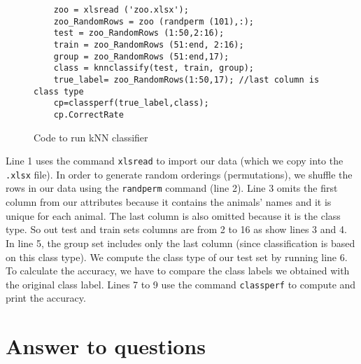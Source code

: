 \documentclass[10pt]{scrartcl}
\begin{document}
\begin{figure}[t]
 \centering
 \begin{verbatim}
    zoo = xlsread ('zoo.xlsx'); 
    zoo_RandomRows = zoo (randperm (101),:); 
    test = zoo_RandomRows (1:50,2:16); 
    train = zoo_RandomRows (51:end, 2:16); 
    group = zoo_RandomRows (51:end,17); 
    class = knnclassify(test, train, group); 
    true_label= zoo_RandomRows(1:50,17); //last column is class type 
    cp=classperf(true_label,class); 
    cp.CorrectRate
 \end{verbatim}
 \caption{Code to run kNN classifier}\label{fig:code}
\end{figure}

Line 1 uses the command \texttt{xlsread} to import our data (which we copy into the \texttt{.xlsx} file).  In order to generate random orderings (permutations), we shuffle the rows in our data using the \texttt{randperm} command (line 2). Line 3 omits the first column from our attributes because it contains the animals' names and it is unique for each animal. The last column is also omitted because it is the class type. So out test and train sets columns are from 2 to 16 as show lines 3 and 4. In line 5, the group set includes only the last column (since classification is based on this class type).  We compute the class type of our test set by running line 6. To calculate the accuracy, we have to compare the class labels we obtained with the original class label. Lines 7 to 9 use the command \texttt{classperf} to compute and print the accuracy.

\section{Answer to questions}
\end{document}
